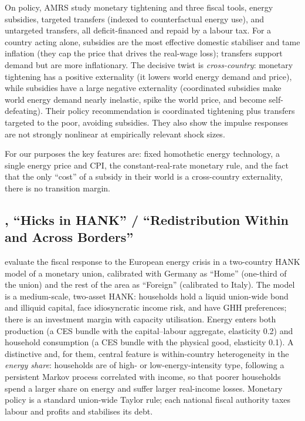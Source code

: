 On policy, AMRS study monetary tightening and three fiscal tools, energy
subsidies, targeted transfers (indexed to counterfactual energy use), and
untargeted transfers, all deficit-financed and repaid by a labour tax. For a
country acting alone, subsidies are the most effective domestic stabiliser and
tame inflation (they cap the price that drives the real-wage loss); transfers
support demand but are more inflationary. The decisive twist is
\emph{cross-country}: monetary tightening has a positive externality (it lowers
world energy demand and price), while subsidies have a large negative
externality (coordinated subsidies make world energy demand nearly inelastic,
spike the world price, and become self-defeating). Their policy recommendation
is coordinated tightening plus transfers targeted to the poor, avoiding
subsidies. They also show the impulse responses are not strongly nonlinear at
empirically relevant shock sizes.

For our purposes the key features are: fixed homothetic energy technology, a
single energy price and CPI, the constant-real-rate monetary rule, and the fact
that the only ``cost'' of a subsidy in their world is a cross-country
externality, there is no transition margin.

\subsection{\citet{Bayer2026}, ``Hicks in HANK'' / ``Redistribution Within and
Across Borders''}

\citet{Bayer2026} evaluate the fiscal response to the European energy crisis in
a two-country HANK model of a monetary union, calibrated with Germany as
``Home'' (one-third of the union) and the rest of the area as ``Foreign''
(calibrated to Italy). The model is a medium-scale, two-asset HANK: households
hold a liquid union-wide bond and illiquid capital, face idiosyncratic income
risk, and have GHH preferences; there is an investment margin with capacity
utilisation. Energy enters both production (a CES bundle with the
capital--labour aggregate, elasticity 0.2) and household consumption (a CES
bundle with the physical good, elasticity 0.1). A distinctive and, for them,
central feature is within-country heterogeneity in the \emph{energy share}:
households are of high- or low-energy-intensity type, following a persistent
Markov process correlated with income, so that poorer households spend a larger
share on energy and suffer larger real-income losses. Monetary policy is a
standard union-wide Taylor rule; each national fiscal authority taxes labour
and profits and stabilises its debt.

